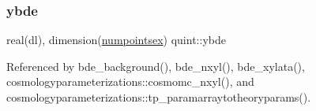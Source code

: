 \subsubsection{\texorpdfstring{ybde}{ybde}}
{\footnotesize\ttfamily real(dl), dimension(\mbox{\hyperlink{namespacequint_a8388814d2fb6e0f54431a7257a8f86a9}{numpointsex}}) quint\+::ybde}



Referenced by bde\+\_\+background(), bde\+\_\+nxyl(), bde\+\_\+xylata(), cosmologyparameterizations\+::cosmomc\+\_\+nxyl(), and cosmologyparameterizations\+::tp\+\_\+paramarraytotheoryparams().

